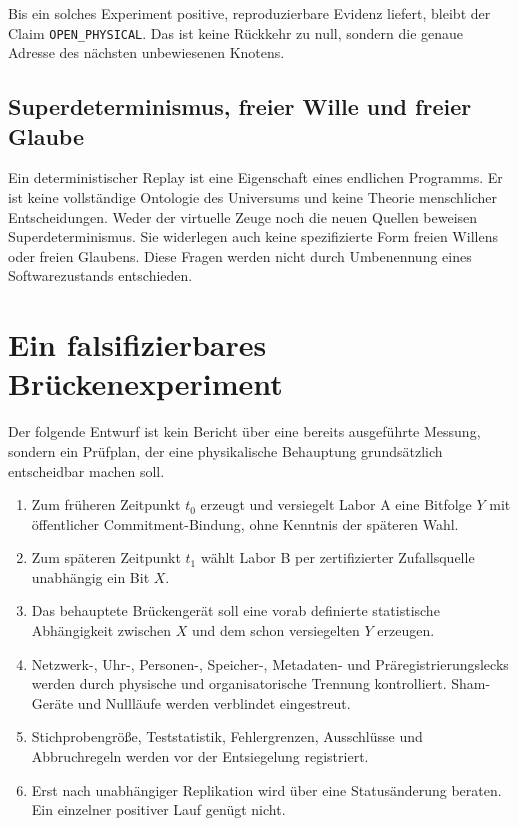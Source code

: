 \documentclass[11pt,a4paper]{article}
\theoremstyle{remark}
\begin{document}
Bis ein solches Experiment positive, reproduzierbare Evidenz liefert, bleibt
der Claim \texttt{OPEN\_PHYSICAL}. Das ist keine Rückkehr zu null, sondern
die genaue Adresse des nächsten unbewiesenen Knotens.

\subsection{Superdeterminismus, freier Wille und freier Glaube}

Ein deterministischer Replay ist eine Eigenschaft eines endlichen Programms.
Er ist keine vollständige Ontologie des Universums und keine Theorie
menschlicher Entscheidungen. Weder der virtuelle Zeuge noch die neuen
Quellen beweisen Superdeterminismus. Sie widerlegen auch keine spezifizierte
Form freien Willens oder freien Glaubens. Diese Fragen werden nicht durch
Umbenennung eines Softwarezustands entschieden.

\section{Ein falsifizierbares Brückenexperiment}

Der folgende Entwurf ist kein Bericht über eine bereits ausgeführte Messung,
sondern ein Prüfplan, der eine physikalische Behauptung grundsätzlich
entscheidbar machen soll.

\begin{enumerate}
  \item Zum früheren Zeitpunkt $t_0$ erzeugt und versiegelt Labor A eine
    Bitfolge $Y$ mit öffentlicher Commitment-Bindung, ohne Kenntnis der
    späteren Wahl.
  \item Zum späteren Zeitpunkt $t_1$ wählt Labor B per zertifizierter
    Zufallsquelle unabhängig ein Bit $X$.
  \item Das behauptete Brückengerät soll eine vorab definierte statistische
    Abhängigkeit zwischen $X$ und dem schon versiegelten $Y$ erzeugen.
  \item Netzwerk-, Uhr-, Personen-, Speicher-, Metadaten- und
    Präregistrierungslecks werden durch physische und organisatorische
    Trennung kontrolliert. Sham-Geräte und Nullläufe werden verblindet
    eingestreut.
  \item Stichprobengröße, Teststatistik, Fehlergrenzen, Ausschlüsse und
    Abbruchregeln werden vor der Entsiegelung registriert.
  \item Erst nach unabhängiger Replikation wird über eine Statusänderung
    beraten. Ein einzelner positiver Lauf genügt nicht.
\end{enumerate}
\end{document}
